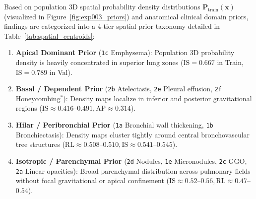 \documentclass[11pt,a4paper]{article}
\begin{document}
Based on population 3D spatial probability density distributions $\mathbf{P}_{\text{train}}(\mathbf{x})$ (visualized in Figure~\ref{fig:exp003_priors}) and anatomical clinical domain priors, findings are categorized into a 4-tier spatial prior taxonomy detailed in Table~\ref{tab:spatial_centroids}:
\begin{enumerate}
    \item \textbf{Apical Dominant Prior} (\texttt{1c} Emphysema): Population 3D probability density is heavily concentrated in superior lung zones ($\text{IS} = 0.667$ in Train, $\text{IS} = 0.789$ in Val).
    \item \textbf{Basal / Dependent Prior} (\texttt{2b} Atelectasis, \texttt{2e} Pleural effusion, \texttt{2f} Honeycombing$^*$): Density maps localize in inferior and posterior gravitational regions ($\text{IS} \approx 0.416$--$0.491, \text{AP} \approx 0.314$).
    \item \textbf{Hilar / Peribronchial Prior} (\texttt{1a} Bronchial wall thickening, \texttt{1b} Bronchiectasis): Density maps cluster tightly around central bronchovascular tree structures ($\text{RL} \approx 0.508$--$0.510, \text{IS} \approx 0.541$--$0.545$).
    \item \textbf{Isotropic / Parenchymal Prior} (\texttt{2d} Nodules, \texttt{1e} Micronodules, \texttt{2c} GGO, \texttt{2a} Linear opacities): Broad parenchymal distribution across pulmonary fields without focal gravitational or apical confinement ($\text{IS} \approx 0.52$--$0.56, \text{RL} \approx 0.47$--$0.54$).
\end{enumerate}
\end{document}
